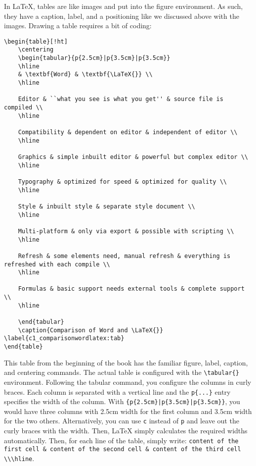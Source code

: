In \LaTeX{}, tables are like images and put into the figure environment. As such, they have a caption, label, and a positioning like we discussed above with the images. Drawing a table requires a bit of coding:
\begin{lstlisting}[language=Tex]
\begin{table}[!ht]
    \centering
    \begin{tabular}{p{2.5cm}|p{3.5cm}|p{3.5cm}}
    \hline
    & \textbf{Word} & \textbf{\LaTeX{}} \\ 
    \hline
    
    Editor & ``what you see is what you get'' & source file is compiled \\
    \hline
    
    Compatibility & dependent on editor & independent of editor \\
    \hline
    
    Graphics & simple inbuilt editor & powerful but complex editor \\
    \hline
    
    Typography & optimized for speed & optimized for quality \\
    \hline
    
    Style & inbuilt style & separate style document \\
    \hline
    
    Multi-platform & only via export & possible with scripting \\
    \hline
    
    Refresh & some elements need, manual refresh & everything is refreshed with each compile \\
    \hline
    
    Formulas & basic support needs external tools & complete support \\
    \hline
    
    \end{tabular}
    \caption{Comparison of Word and \LaTeX{}} \label{c1_comparisonwordlatex:tab}
\end{table}
\end{lstlisting}

This table from the beginning of the book has the familiar figure, label, caption, and centering commands. The actual table is configured with the \lstinline[language=Tex]!\tabular{}! environment. Following the tabular command, you configure the columns in curly braces. Each column is separated with a vertical line and the \lstinline[language=Tex]!p{...}! entry specifies the width of the column. With \lstinline[language=Tex]!{p{2.5cm}|p{3.5cm}|p{3.5cm}}!, you would have three columns with 2.5cm width for the first column and 3.5cm width for the two others. Alternatively, you can use \lstinline[language=Tex]!c! instead of \lstinline[language=Tex]!p! and leave out the curly braces with the width. Then, \LaTeX{} simply calculates the required widths automatically. Then, for each line of the table, simply write: \lstinline[language=Tex]!content of the first cell & content of the second cell & content of the third cell \\\hline!.

